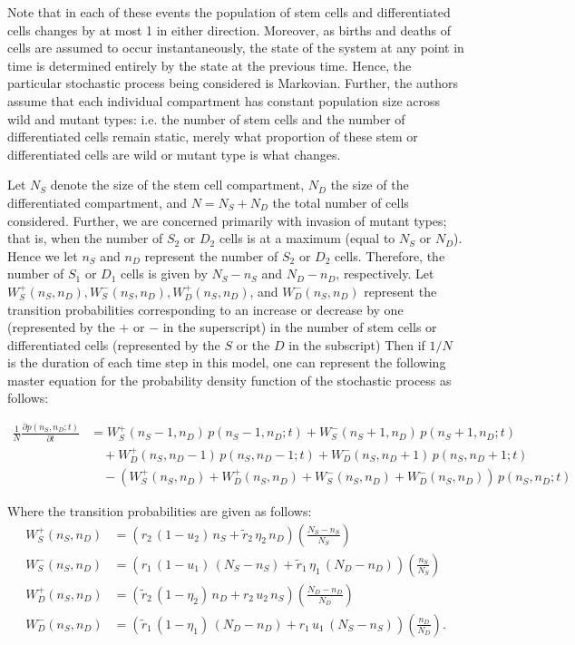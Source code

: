 \documentclass[12pt]{article}
\begin{document}
Note that in each of these events the population of stem cells and differentiated cells changes by at most 1 in either direction. Moreover, as births and deaths of cells are assumed to occur instantaneously, the state of the system at any point in time is determined entirely by the state at the previous time. Hence, the particular stochastic process being considered is Markovian. Further, the authors assume that each individual compartment has constant population size across wild and mutant types: i.e. the number of stem cells and the number of differentiated cells remain static, merely what proportion of these stem or differentiated cells are wild or mutant type is what changes. 

Let $N_S$ denote the size of the stem cell compartment, $N_D$ the size of the differentiated compartment, and $N=N_S+N_D$ the total number of cells considered. Further, we are concerned primarily with invasion of mutant types; that is, when the number of $S_2$ or $D_2$ cells is at a maximum (equal to $N_S$ or $N_D$). Hence we let $n_S$ and $n_D$ represent the number of $S_2$ or $D_2$ cells. Therefore, the number of $S_1$ or $D_1$ cells is given by $N_S-n_S$ and $N_D-n_D$, respectively. Let $W_S^+(n_S,n_D), W_S^-(n_S,n_D), W_D^+(n_S,n_D)$, and $W_D^-(n_S,n_D)$ represent the transition probabilities corresponding to an increase or decrease by one (represented by the $+$ or $-$ in the superscript) in the number of stem cells or differentiated cells (represented by the $S$ or the $D$ in the subscript) Then if $1/N$ is the duration of each time step in this model, one can represent the following master equation for the probability density function of the stochastic process as follows:

\begin{align}
\frac{1}{N}\frac{\partial p(n_S,n_D;t)}{\partial t}&=W_S^+(n_S-1,n_D)\, p(n_S-1,n_D;t) + W_S^-(n_S+1,n_D)\, p(n_S+1,n_D;t)\nonumber\\
&\quad
+ W_D^+(n_S,n_D-1)\, p(n_S,n_D-1;t) + W_D^-(n_S,n_D+1)\, p(n_S,n_D+1;t)\nonumber\\
&\quad
-(W_S^+(n_S,n_D)+W_D^+(n_S,n_D)+W_S^-(n_S,n_D)+W_D^-(n_S,n_D))\, p(n_S,n_D;t)
\label{MohRef1}
\end{align}

Where the transition probabilities are given as follows:
\begin{align}
W_S^+(n_S,n_D) &= \left(r_2\,(1-u_2)\,n_S+\tilde{r}_2\,\eta_2\,n_D\right)\left(\frac{N_S-n_S}{N_S}\right)\label{MohRef2}\\
W_S^-(n_S,n_D) &= \left(r_1\,(1-u_1)\,(N_S-n_S)+\tilde{r}_1\,\eta_1\,(N_D-n_D)\right)\left(\frac{n_S}{N_S}\right)\\
W_D^+(n_S,n_D) &= \left(\tilde{r}_2\,(1-\eta_2)\,n_D+r_2\,u_2\,n_S\right)\left(\frac{N_D-n_D}{N_D}\right)\\
W_D^-(n_S,n_D) &= \left(\tilde{r}_1\,(1-\eta_1)\,(N_D-n_D)+r_1\,u_1\,(N_S-n_S)\right)\left(\frac{n_D}{N_D}\right).
\label{MohRef3}
\end{align}
\end{document}
